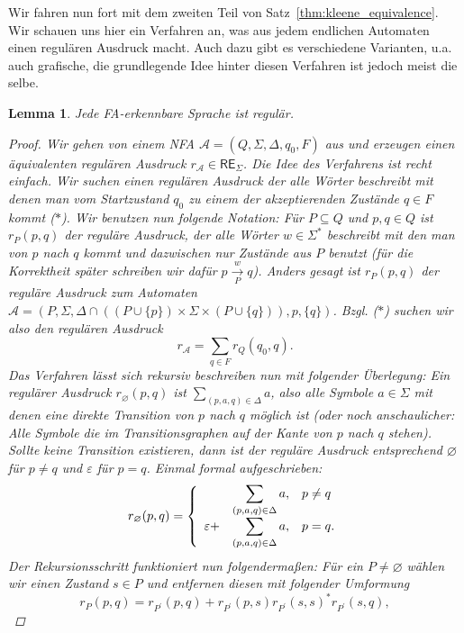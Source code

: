 \documentclass[11pt, a4paper]{article}
\theoremstyle{definition}
\theoremstyle{plain}
\newtheorem{lemma}[definition]{Lemma}
\numberwithin{equation}{section}
\newcommand{\reachess}[2]{\overset{#1}{\underset{#2}{\rightarrow}}}
\let\emptyset\varnothing
\begin{document}
Wir fahren nun fort mit dem zweiten Teil von Satz~\ref{thm:kleene_equivalence}. Wir schauen uns hier ein Verfahren an, was aus jedem endlichen Automaten einen regulären Ausdruck macht. Auch dazu gibt es verschiedene Varianten, u.a. auch grafische, die grundlegende Idee hinter diesen Verfahren ist jedoch meist die selbe.
\begin{lemma}\label{lem:nfa2regex}
	Jede FA-erkennbare Sprache ist regulär.
	\begin{proof}
		Wir gehen von einem NFA $\mathcal{A} = (Q, \Sigma, \Delta, q_0, F)$ aus und erzeugen einen äquivalenten regulären Ausdruck $r_\mathcal{A} \in \mathsf{RE}_\Sigma$. Die Idee des Verfahrens ist recht einfach. Wir suchen einen regulären Ausdruck der alle Wörter beschreibt mit denen man vom Startzustand $q_0$ zu einem der akzeptierenden Zustände $q \in F$ kommt ($\ast$). Wir benutzen nun folgende Notation: Für $P \subseteq Q$ und $p, q \in Q$ ist $r_P(p, q)$ der reguläre Ausdruck, der alle Wörter $w \in \Sigma^\ast$ beschreibt mit den man von $p$ nach $q$ kommt und dazwischen nur Zustände aus $P$ benutzt (für die Korrektheit später schreiben wir dafür $p \reachess{w}{P} q$). Anders gesagt ist $r_P(p, q)$ der reguläre Ausdruck zum Automaten $\mathcal{A} = (P, \Sigma, \Delta \cap ((P \cup \{p\}) \times \Sigma \times (P \cup \{q\})), p, \{q\})$. Bzgl. ($\ast$) suchen wir also den regulären Ausdruck
		$$
			r_\mathcal{A} = \sum_{q \in F} r_Q(q_0, q).
		$$
		Das Verfahren lässt sich rekursiv beschreiben nun mit folgender Überlegung: Ein regulärer Ausdruck $r_\emptyset(p, q)$ ist $\sum_{(p, a, q) \in \Delta} a$, also alle Symbole $a \in \Sigma$ mit denen eine direkte Transition von $p$ nach $q$ möglich ist (oder noch anschaulicher: Alle Symbole die im Transitionsgraphen auf der Kante von $p$ nach $q$ stehen). Sollte keine Transition existieren, dann ist der reguläre Ausdruck entsprechend $\emptyset$ für $p \neq q$ und $\varepsilon$ für $p = q$. Einmal formal aufgeschrieben:
		$$
			r_\emptyset(p, q) = \left\lbrace
				\begin{array}{*3{>{\displaystyle}l}p{5cm}}
					\ &\sum_{(p, a, q) \in \Delta} a, & p \neq q\\
					\varepsilon + &\sum_{(p, a, q) \in \Delta} a, & p = q.
				\end{array}
			\right.
		$$
		Der Rekursionsschritt funktioniert nun folgendermaßen: Für ein $P \neq \emptyset$ wählen wir einen Zustand  $s \in P$ und entfernen diesen mit folgender Umformung
		$$
			r_P(p, q) = r_{P^\prime}(p, q) + r_{P^\prime}(p, s) r_{P^\prime}(s, s)^\ast r_{P^\prime}(s, q),
$$
\end{proof}
\end{lemma}
\end{document}
